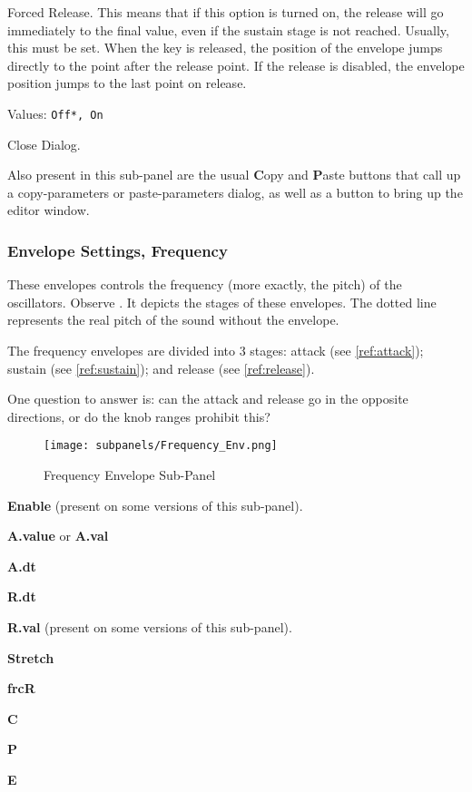    Forced Release.
   This means that if this option is turned on, the release will go
   immediately to the final value, even if the sustain stage is not reached.
   Usually, this must be set.
   When the key is released, the position of the envelope jumps directly to
   the point after the release point. If the release is disabled, the
   envelope position jumps to the last point on release.

   Values: \texttt{Off*, On}

   Close Dialog.

   Also present in this sub-panel are the usual \textbf{C}opy
   and \textbf{P}aste buttons that call up a copy-parameters or
   paste-parameters dialog, as well as a button
   to bring up the editor window.

\subsubsection{Envelope Settings, Frequency}
\label{subsubsec:envelope_settings_for_frequency}

   These envelopes controls the frequency (more exactly, the pitch) of the
   oscillators.
   Observe .
   It depicts the stages of these envelopes.
   The dotted line represents the real pitch of the sound without the envelope.

   The frequency envelopes are divided into 3 stages:
   attack (see \ref{ref:attack});
   sustain (see \ref{ref:sustain});
   and
   release (see \ref{ref:release}).

   One question to answer is:
   can the attack and release go in the opposite directions, or do the knob
   ranges prohibit this?

\begin{figure}[H]
   \centering
   \texttt{[image: subpanels/Frequency\_Env.png]}
   \caption[Frequency Envelope Sub-Panel]{Frequency Envelope Sub-Panel}
   \label{fig:frequency_env}
\end{figure}

   \begin{enumber}
      \item \textbf{Enable} (present on some versions of this sub-panel).
      \item \textbf{A.value} or \textbf{A.val}
      \item \textbf{A.dt}
      \item \textbf{R.dt}
      \item \textbf{R.val} (present on some versions of this sub-panel).
      \item \textbf{Stretch}
      \item \textbf{frcR}
      \item \textbf{C}
      \item \textbf{P}
      \item \textbf{E}
   \end{enumber}

